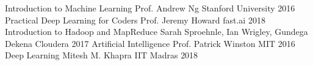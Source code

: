 \begin{cvhonors}
  \cvhonor
   {Introduction to Machine Learning}
    {Prof. Andrew Ng}
    {Stanford University}
    {2016}
  \cvhonor
    {Practical Deep Learning for Coders}
    {Prof.  Jeremy Howard}
    {fast.ai}
    {2018}
  \cvhonor
    {Introduction to Hadoop and MapReduce}
    {Sarah Sproehnle, Ian Wrigley, Gundega Dekena}
    {Cloudera}
    {2017}
  \cvhonor
    {Artificial Intelligence}
    {Prof. Patrick Winston}
    {MIT}
    {2016}
  \cvhonor
    {Deep Learning}
    {Mitesh M. Khapra}
    {IIT Madras}
    {2018}

\end{cvhonors}